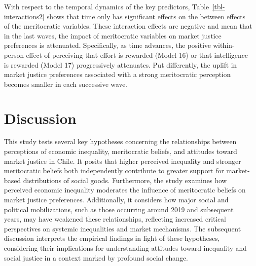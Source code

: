 \documentclass[
  12pt,
]{article}
\begin{document}
\begin{table}
{}

\end{table}%

With respect to the temporal dynamics of the key predictors,
Table~\ref{tbl-interactions2} shows that time only has significant
effects on the between effects of the meritocratic variables. These
interaction effects are negative and mean that in the last waves, the
impact of meritocratic variables on market justice preferences is
attenuated. Specifically, as time advances, the positive within-person
effect of perceiving that effort is rewarded (Model 16) or that
intelligence is rewarded (Model 17) progressively attenuates. Put
differently, the uplift in market justice preferences associated with a
strong meritocratic perception becomes smaller in each successive wave.

\section{Discussion}\label{discussion}

This study tests several key hypotheses concerning the relationships
between perceptions of economic inequality, meritocratic beliefs, and
attitudes toward market justice in Chile. It posits that higher
perceived inequality and stronger meritocratic beliefs both
independently contribute to greater support for market-based
distributions of social goods. Furthermore, the study examines how
perceived economic inequality moderates the influence of meritocratic
beliefs on market justice preferences. Additionally, it considers how
major social and political mobilizations, such as those occurring around
2019 and subsequent years, may have weakened these relationships,
reflecting increased critical perspectives on systemic inequalities and
market mechanisms. The subsequent discussion interprets the empirical
findings in light of these hypotheses, considering their implications
for understanding attitudes toward inequality and social justice in a
context marked by profound social change.
\end{document}
